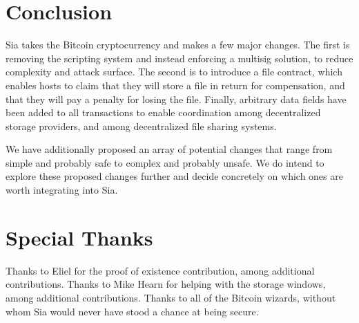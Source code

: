 \documentclass[twocolumn]{article}
\begin{document}
\section{Conclusion}
Sia takes the Bitcoin cryptocurrency and makes a few major changes.
The first is removing the scripting system and instead enforcing a multisig solution, to reduce complexity and attack surface.
The second is to introduce a file contract, which enables hosts to claim that they will store a file in return for compensation, and that they will pay a penalty for losing the file.
Finally, arbitrary data fields have been added to all transactions to enable coordination among decentralized storage providers, and among decentralized file sharing systems.

We have additionally proposed an array of potential changes that range from simple and probably safe to complex and probably unsafe.
We do intend to explore these proposed changes further and decide concretely on which ones are worth integrating into Sia.

\section{Special Thanks}
Thanks to Eliel for the proof of existence contribution, among additional contributions.
Thanks to Mike Hearn for helping with the storage windows, among additional contributions.
Thanks to all of the Bitcoin wizards, without whom Sia would never have stood a chance at being secure.
\end{document}
